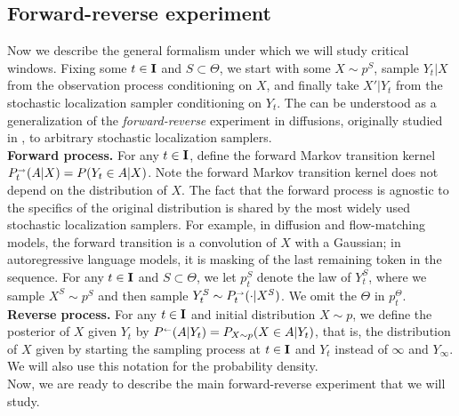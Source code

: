\subsection{Forward-reverse experiment}
Now we describe the general formalism under which we will study critical windows. Fixing some $t \in \mathbf{I}$ and $S \subset \Theta$, we start with some $X \sim p^S$, sample $Y_t|X$ from the observation process conditioning on $X$, and finally take $X'|Y_t$ from the stochastic localization sampler conditioning on $Y_t$. The can be understood as a generalization of the \emph{forward-reverse} experiment in diffusions, originally studied in \citep{sclocchi2024phasetransitiondiffusionmodels,sclocchi2024probinglatenthierarchicalstructure,li2024criticalwindowsnonasymptotictheory}, to arbitrary stochastic localization samplers. \\ 


\noindent \textbf{Forward process.} \enspace For any $t \in \mathbf{I}$, define the forward Markov transition kernel $\kernelforward_t(A|X)=P(Y_t \in A|X)$. Note the forward Markov transition kernel does not depend on the distribution of $X$. The fact that the forward process is agnostic to the specifics of the original distribution is shared by the most widely used stochastic localization samplers. For example, in diffusion and flow-matching models, the forward transition is a convolution of $X$ with a Gaussian; in autoregressive language models, it is masking of the last remaining token in the sequence. For any $t \in \mathbf{I}$ and $S \subset \Theta$, we let $p_t^S$ denote the law of $Y_t^S$, where we sample $X^S \sim p^S$ and then sample $Y_t^S \sim \kernelforward_t(\cdot |X^S)$. We omit the $\Theta$ in $p_t^\Theta$. \\

\noindent\textbf{Reverse process.} \enspace For any $t\in \mathbf{I}$ and initial distribution $X \sim p$, we define the posterior of $X$ given $Y_t$ by $\kernelreverse[](A|Y_{t})=P_{X \sim p}(X \in A|Y_{t})$, that is, the distribution of $X$ given by starting the sampling process at $t \in \mathbf{I}$ and $Y_t$ instead of $\infty$ and $Y_\infty$. We will also use this notation for the probability density. \\

\noindent Now, we are ready to describe the main forward-reverse experiment that we will study. 

